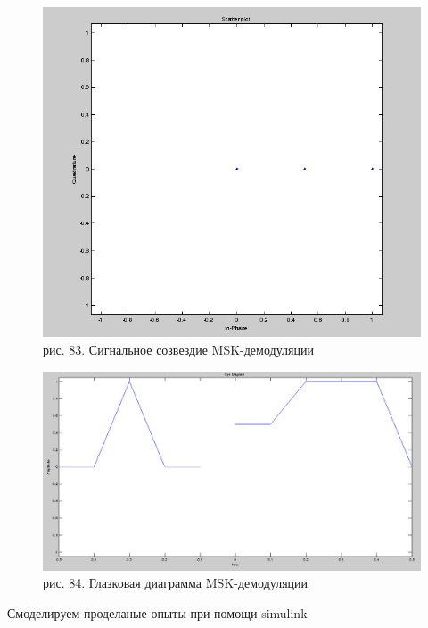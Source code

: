 \documentclass[10pt,a4paper]{report}
\begin{document}
\begin{figure}
\begin{center}
\includegraphics[width=150mm, scale = 0.9]{9_19}\newline
рис. 83. Сигнальное созвездие MSK-демодуляции\newline
\end{center}
\end{figure}
\begin{figure}
\begin{center}
\includegraphics[width=150mm, scale = 0.9]{9_20}\newline
рис. 84. Глазковая диаграмма MSK-демодуляции\newline
\end{center}
\end{figure}
Смоделируем проделаные опыты при помощи simulink
\end{document}
